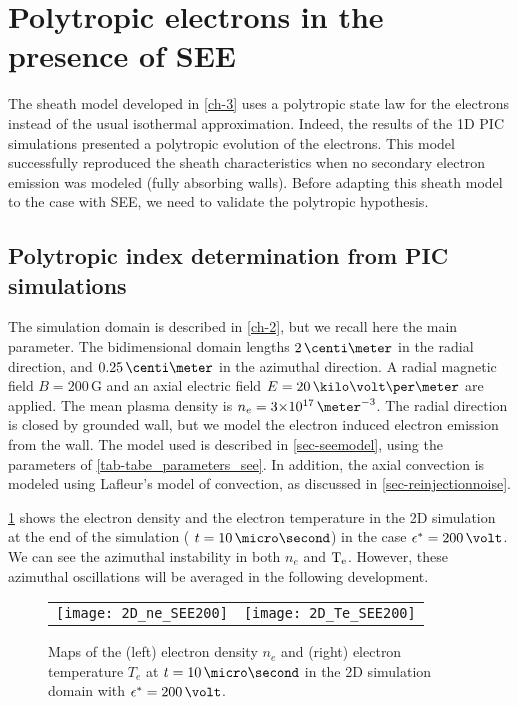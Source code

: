 

\section{Polytropic electrons in the presence of \acs{SEE}}
\label{sec-PIC_poly}

The sheath model developed in \cref{ch-3} uses a polytropic state law for the electrons instead of the usual isothermal approximation.
Indeed, the results of the  \ac{1D} \ac{PIC} simulations presented a polytropic evolution of the electrons.
This model successfully reproduced the sheath characteristics  when no secondary electron emission was modeled (fully absorbing walls).
Before adapting this sheath model to the case with \ac{SEE}, we need to validate the polytropic hypothesis.


\subsection{Polytropic index determination from PIC simulations} \label{subsec-fluid_see_polyfit}


The simulation domain is described in \cref{ch-2}, but we recall here the main parameter.
The bidimensional domain lengths $2\,\centi\meter$ in the radial direction, and $0.25\,\centi\meter$ in the azimuthal direction.
A radial magnetic field $B=200\,$G and an axial electric field $E=20\,\kilo\volt\per\meter$ are applied.
The mean plasma density is $n_e = \sn{3}{17}\,\meter^{-3}$.
The radial direction is closed by grounded wall, but we model the electron induced electron emission from the wall.
The model used is described in \cref{sec-seemodel}, using the parameters of \cref{tab-tabe_parameters_see}.
In addition, the axial convection is modeled using Lafleur's model of convection, as discussed in \cref{sec-reinjectionnoise}.

\cref{fig-2DneTe} shows the electron density and the electron temperature in the \ac{2D} simulation at the end of the simulation ( $t=10\,\micro\second$) in the case $\crover=200\,\volt$.
We can see the azimuthal instability in both $n_e$ and $\mathrm{T_e}$.
However, these azimuthal oscillations will be averaged in the following development. 

\begin{figure}[!htb]
  \centering
  \begin{tabular}{@{} c c}
    \texttt{[image: 2D\_ne\_SEE200]} &
    \texttt{[image: 2D\_Te\_SEE200]} \\
  \end{tabular}
  \caption{Maps of the (left) electron density $n_e$ and (right) electron temperature $T_e$ at $t=10\,\micro\second$ in the \acs{2D} simulation domain with $\crover=200\,\volt$.}
  \label{fig-2DneTe}
\end{figure}



